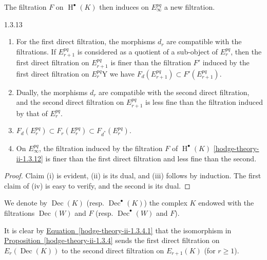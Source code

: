    The filtration \(F\) on \(\operatorname {H}^\bullet (K)\) then induces on \(E_\infty ^{pq}\) a new filtration.\begin{proposition}{1.3.13}\label{hodge-theory-ii-1.3.13}\skipsinglepar\begin{enumerate}
    
 \item[(i)]
      For the first direct filtration, the morphisms \(d_r\) are compatible with the filtrations.
      If \(E_{r+1}^{pq}\) is considered as a quotient of a sub-object of \(E_r^{pq}\), then the first direct filtration on \(E_{r+1}^{pq}\) is finer than the filtration \(F'\) induced by the first direct filtration on \(E_r^{pq}\)Y we have \(F_d(E_{r+1}^{pq})\subset  F'(E_{r+1}^{pq})\).
    


    
 \item[(ii)]
      Dually, the morphisms \(d_r\) are compatible with the second direct filtration, and the second direct filtration on \(E_{r+1}^{pq}\) is less fine than the filtration induced by that of \(E_r^{pq}\).
    


    
 \item[(iii)]
      \(F_d(E_r^{pq})\subset  F_r(E_r^{pq})\subset  F_{d^*}(E_r^{pq})\).
    


    
 \item[(iv)]
      On \(E_\infty ^{pq}\), the filtration induced by the filtration \(F\) of \(\operatorname {H}^\bullet (K)\) \cref{hodge-theory-ii-1.3.12} is finer than the first direct filtration and less fine than the second.
    

  \end{enumerate}\begin{proof}\par{}Claim (i) is evident, (ii) is its dual, and (iii) follows by induction.
      The first claim of (iv) is easy to verify, and the second is its dual.\end{proof}\end{proposition}\label{hodge-theory-ii-1.3.14}\par{}We denote by \(\operatorname {Dec}(K)\) (resp. \(\operatorname {Dec}^\bullet (K)\)) the complex \(K\) endowed with the filtrations \(\operatorname {Dec}(W)\) and \(F\) (resp. \(\operatorname {Dec}^\bullet (W)\) and \(F\)).\par{}It is clear by \hyperref[hodge-theory-ii-1.3.4.1]{Equation~\ref*{hodge-theory-ii-1.3.4.1}} that the isomorphism in \hyperref[hodge-theory-ii-1.3.4]{Proposition~\ref*{hodge-theory-ii-1.3.4}} sends the first direct filtration on \(E_r(\operatorname {Dec}(K))\) to the second direct filtration on \(E_{r+1}(K)\) (for \(r\geqslant 1\)).
